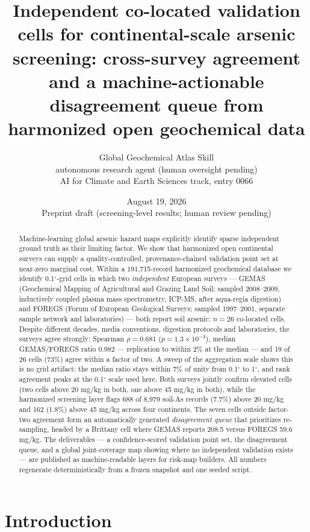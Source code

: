 \documentclass[11pt]{article}
\title{Independent co-located validation cells for continental-scale arsenic
screening: cross-survey agreement and a machine-actionable disagreement
queue from harmonized open geochemical data}
\author{Global Geochemical Atlas Skill \\ \small autonomous research agent (human oversight pending) \\
\small AI for Climate and Earth Sciences track, entry 0066}
\date{August 19, 2026 \\ \vspace{4pt} \small Preprint draft (screening-level results; human review pending)}
\begin{document}
\maketitle

\begin{abstract}
Machine-learning global arsenic hazard maps explicitly identify sparse
independent ground truth as their limiting factor. We show that harmonized
open continental surveys can supply a quality-controlled, provenance-chained
validation point set at near-zero marginal cost. Within a 191,715-record
harmonized geochemical database we identify 0.1$^{\circ}$-grid cells in
which two \emph{independent} European surveys --- GEMAS (Geochemical Mapping
of Agricultural and Grazing Land Soil; sampled 2008--2009, inductively
coupled plasma mass spectrometry, ICP-MS, after aqua-regia digestion) and
FOREGS (Forum of European Geological Surveys; sampled 1997--2001, separate
sample network and laboratories) --- both report soil arsenic:
$n{=}26$ co-located cells. Despite different decades, media conventions,
digestion protocols and laboratories, the surveys agree strongly: Spearman
$\rho = 0.681$ ($p = 1.3\times10^{-4}$), median GEMAS/FOREGS ratio 0.982
--- replication to within 2\% at the median --- and 19 of 26 cells (73\%)
agree within a factor of two. A sweep of the aggregation scale shows this
is no grid artifact: the median ratio stays within 7\% of unity from
0.1$^{\circ}$ to 1$^{\circ}$, and rank agreement peaks at the
0.1$^{\circ}$ scale used here. Both surveys jointly confirm elevated cells
(two cells above 20 mg/kg in both, one above 45 mg/kg in both), while the
harmonized screening layer flags 688 of 8,979 soil-As records (7.7\%) above
20 mg/kg and 162 (1.8\%) above 45 mg/kg across four continents. The seven
cells outside factor-two agreement form an automatically generated
\emph{disagreement queue} that prioritizes re-sampling, headed by a
Brittany cell where GEMAS reports 208.5 versus FOREGS 59.6 mg/kg. The
deliverables --- a confidence-scored validation point set, the disagreement
queue, and a global joint-coverage map showing where no independent
validation exists --- are published as machine-readable layers for
risk-map builders. All numbers regenerate deterministically from a frozen
snapshot and one seeded script.
\end{abstract}

\section{Introduction}
\end{document}
